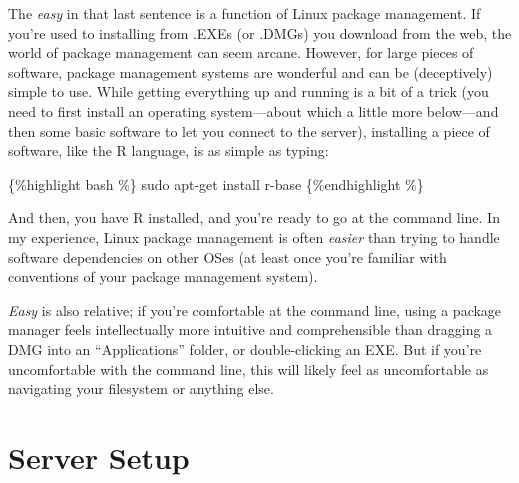 \documentclass[
  12pt,
]{article}
\begin{document}
The \emph{easy} in that last sentence is a function of Linux package
management. If you're used to installing from .EXEs (or .DMGs) you
download from the web, the world of package management can seem arcane.
However, for large pieces of software, package management systems are
wonderful and can be (deceptively) simple to use. While getting
everything up and running is a bit of a trick (you need to first install
an operating system---about which a little more below---and then some
basic software to let you connect to the server), installing a piece of
software, like the R language, is as simple as typing:

\{\%highlight bash \%\} sudo apt-get install r-base \{\%endhighlight
\%\}

And then, you have R installed, and you're ready to go at the command
line. In my experience, Linux package management is often \emph{easier}
than trying to handle software dependencies on other OSes (at least once
you're familiar with conventions of your package management system).

\emph{Easy} is also relative; if you're comfortable at the command line,
using a package manager feels intellectually more intuitive and
comprehensible than dragging a DMG into an ``Applications'' folder, or
double-clicking an EXE. But if you're uncomfortable with the command
line, this will likely feel as uncomfortable as navigating your
filesystem or anything else.

\hypertarget{server-setup}{%
\section{Server Setup}\label{server-setup}}
\end{document}

